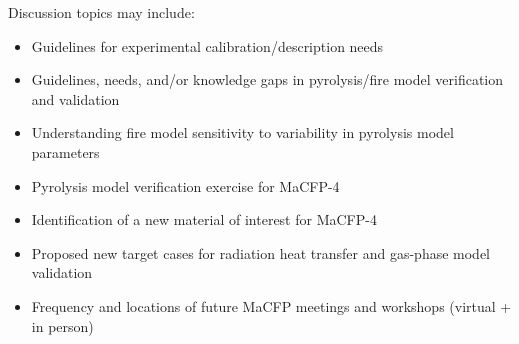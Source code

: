 \documentclass[12pt]{article}
\begin{document}
Discussion topics may include:

\begin{itemize}[noitemsep,topsep=0pt]
\item Guidelines for experimental calibration/description needs
\item Guidelines, needs, and/or knowledge gaps in pyrolysis/fire model verification and validation
\item Understanding fire model sensitivity to variability in pyrolysis model parameters
\item Pyrolysis model verification exercise for MaCFP-4
\item Identification of a new material of interest for MaCFP-4
\item Proposed new target cases for radiation heat transfer and gas-phase model validation
\item Frequency and locations of future MaCFP meetings and workshops (virtual + in person)
\end{itemize}
\end{document}
